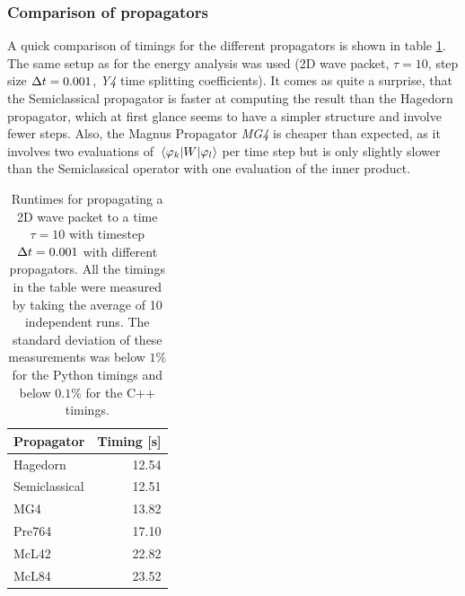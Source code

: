 \subsubsection{Comparison of propagators}
%
A quick comparison of timings for the different propagators is shown in table \ref{tab:speedup}.
The same setup as for the energy analysis was used (2D wave packet, $\tau = 10$, step size $\Delta t = 0.001$, \emph{Y4} time splitting coefficients).
It comes as quite a surprise, that the Semiclassical propagator is faster at computing the result than the Hagedorn propagator, which at first glance seems to have  a simpler structure and involve fewer steps.
Also, the Magnus Propagator \emph{MG4} is cheaper than expected, as it involves two evaluations of $\matrixel{\varphi_k}{W}{\varphi_l}$ per time step but is only slightly slower than the Semiclassical operator with one evaluation of the inner product.
%
\begin{table}[h]
	\centering
	\begin{tabular}{|l | r |} 
		\hline
		\multicolumn{1}{|c}{\textbf{Propagator}} &
		\multicolumn{1}{|c|}{\textbf{Timing [s]}} \\
		\hline
		Hagedorn & 12.54 \\
		Semiclassical & 12.51 \\
		MG4 & 13.82 \\
		Pre764 & 17.10 \\
		McL42 & 22.82 \\
		McL84 & 23.52 \\
		\hline
	\end{tabular}
	\caption{Runtimes for propagating a 2D wave packet to a time $\tau = 10$ with timestep $\Delta t = 0.001$ with different propagators. All the timings in the table were measured by taking the average of 10 independent runs. The standard deviation of these measurements was below $1\%$ for the Python timings and below $0.1\%$ for the C++ timings.}
	\label{tab:speedup}
\end{table}


